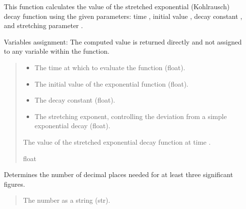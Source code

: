 \documentclass[letterpaper,10pt,english]{sphinxmanual}
\begin{document}
\begin{fulllineitems}
\begin{fulllineitems}
\sphinxAtStartPar
This function calculates the value of the stretched exponential (Kohlrausch) decay function using the given parameters: 
time , initial value , decay constant , and stretching parameter .

\sphinxAtStartPar
Variables assignment:
\sphinxhyphen{} The computed value is returned directly and not assigned to any variable within the function.
\begin{quote}\begin{description}
\begin{itemize}
\item {} 
\sphinxAtStartPar
{} \textendash{} The time at which to evaluate the function (float).

\item {} 
\sphinxAtStartPar
{} \textendash{} The initial value of the exponential function (float).

\item {} 
\sphinxAtStartPar
{} \textendash{} The decay constant (float).

\item {} 
\sphinxAtStartPar
{} \textendash{} The stretching exponent, controlling the deviation from a simple exponential decay (float).

\end{itemize}

\sphinxAtStartPar
The value of the stretched exponential decay function at time .

\sphinxAtStartPar
float

\end{description}\end{quote}

\end{fulllineitems}


\begin{fulllineitems}
\label{\detokenize{FLIMGraphics:FLIMGraphics.FLIMGraphic.maxRound}}
\pysigstartsignatures
{}
\pysigstopsignatures
\sphinxAtStartPar
Determines the number of decimal places needed for at least three significant figures.
\begin{quote}\begin{description}
\sphinxAtStartPar
{} \textendash{} The number as a string (str).


\end{description}
\end{quote}
\end{fulllineitems}
\end{fulllineitems}
\end{document}
